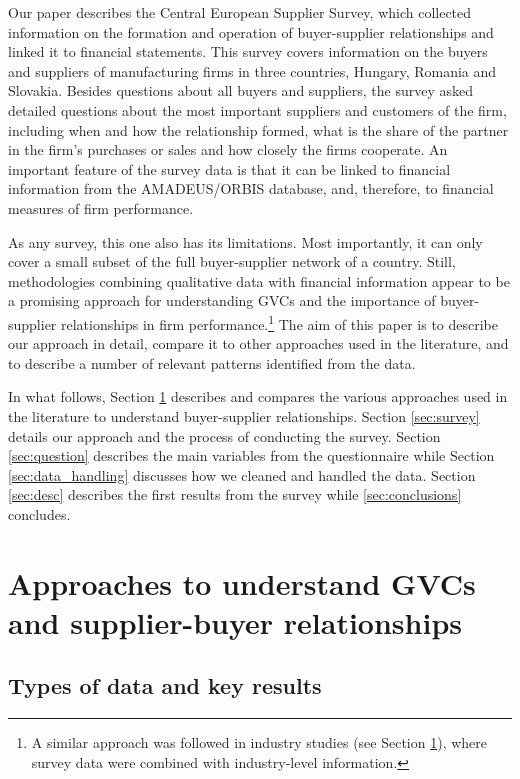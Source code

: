 \documentclass[final, dvipsnames, authoryear,12pt]{elsarticle}
\begin{document}
Our paper describes the Central European Supplier Survey, which collected information on the formation and operation of buyer-supplier relationships and linked it to financial statements. This survey covers information on the buyers and suppliers of  manufacturing firms in three countries, Hungary, Romania and Slovakia. Besides questions about all buyers and suppliers, the survey asked detailed questions about the most important suppliers and customers of the firm, including when and how the relationship formed, what is the share of the partner in the firm's purchases or sales and how closely the firms cooperate. An important feature of the survey data is that it can be linked to financial information from the AMADEUS/ORBIS database, and, therefore, to financial measures of firm performance. 

As any survey, this one also has its limitations. Most importantly, it can only cover a small subset of the full buyer-supplier network of a country. Still, methodologies combining qualitative data with financial information appear to be a promising approach for understanding GVCs and the importance of buyer-supplier relationships in firm performance.\footnote{A similar approach was followed in industry studies (see Section \ref{sec: approach}), where survey data were combined with industry-level information.} The aim of this paper is to describe our approach in detail, compare it to other approaches used in the literature, and to describe a number of relevant patterns identified from the data. 

In what follows, Section \ref{sec: approach} describes and compares the various approaches used in the literature to understand buyer-supplier relationships. Section \ref{sec:survey} details our approach and the process of conducting the survey. Section \ref{sec:question} describes the main variables from the questionnaire while Section \ref{sec:data_handling} discusses how we cleaned and handled the data. Section \ref{sec:desc} describes the first results from the survey while \ref{sec:conclusions} concludes.  

\section{Approaches to understand GVCs and supplier-buyer relationships} 
\label{sec: approach}

\subsection{Types of data and key results}
\end{document}
